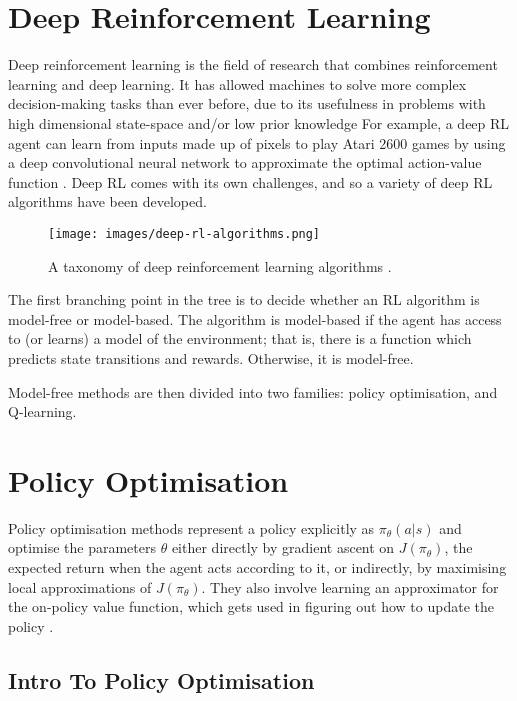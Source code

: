 \documentclass{article}
\begin{document}
\section{Deep Reinforcement Learning}

Deep reinforcement learning is the field of research that combines reinforcement learning and deep learning. It has allowed machines to solve more complex decision-making tasks than ever before, due to its usefulness in problems with high dimensional state-space and/or low prior knowledge \cite{DBLP:journals/corr/abs-1811-12560} For example, a deep RL agent can learn from inputs made up of pixels to play Atari 2600 games by using a deep convolutional neural network to approximate the optimal action-value function \cite{Mnih2015}. Deep RL comes with its own challenges, and so a variety of deep RL algorithms have been developed.

\begin{figure}[h]
  \centering
  \texttt{[image: images/deep-rl-algorithms.png]}
  \caption{A taxonomy of deep reinforcement learning algorithms \cite{openai_2018}.}
  \label{fig:deep-rl-algorithms}
\end{figure}

The first branching point in the tree is to decide whether an RL algorithm is model-free or model-based. The algorithm is model-based if the agent has access to (or learns) a model of the environment; that is, there is a function which predicts state transitions and rewards. Otherwise, it is model-free.

Model-free methods are then divided into two families: policy optimisation, and Q-learning.

\section{Policy Optimisation}

Policy optimisation methods represent a policy explicitly as $\pi_\theta(a|s)$ and optimise the parameters $\theta$ either directly by gradient ascent on $J(\pi_\theta)$, the expected return when the agent acts according to it, or indirectly, by maximising local approximations of $J(\pi_\theta)$. They also involve learning an approximator for the on-policy value function, which gets used in figuring out how to update the policy \cite{openai_2018}.

\subsection{Intro To Policy Optimisation}
\end{document}
